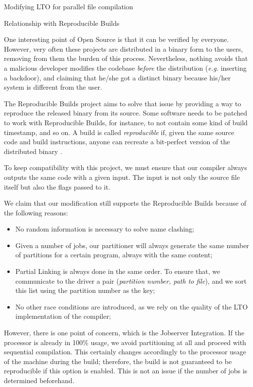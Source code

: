 \begin{section}{Modifying LTO for parallel file compilation}
\begin{subsection}{Relationship with Reproducible Builds}\label{sec:repro_builds}

One interesting point of Open Source is that it can be verified by everyone.
However, very often these projects are distributed in a binary form to the
users, removing from them the burden of this process. Nevertheless, nothing avoids that a
malicious developer modifies the codebase \textit{before} the distribution
(\textit{e.g.} inserting a backdoor), and claiming that he/she got a distinct
binary because his/her system is different from the user.

The Reproducible Builds project aims to solve that issue by providing a way to
reproduce the released binary from its source. Some software needs to
be patched to work with Reproducible Builds, for instance,
to not contain some kind of build timestamp, and so on. A build
is called \textit{reproducible} if, given the same source code and build
instructions, anyone can recreate a bit-perfect version of the distributed
binary \citep{reproducible_builds}.

To keep compatibility with this project, we must ensure that our compiler
always outputs the same code with a given input. The input is not only
the source file itself but also the flags passed to it.

We claim that our modification still supports the Reproducible Builds because
of the following reasons:

\begin{itemize}
	\item No random information is necessary to solve name clashing;
	\item Given a number of jobs, our partitioner will always generate
	the same number of partitions for a certain program, always with the same content;
	\item Partial Linking is always done in the same order. To ensure that,
	we communicate to the driver a pair (\textit{partition number, path to file}),
	and we sort this list using the partition number as the key;
	\item No other race conditions are introduced, as we rely on the quality of
	the LTO implementation of the compiler;
\end{itemize}

However, there is one point of concern, which is the Jobserver Integration.  If
the processor is already in 100\% usage, we avoid partitioning at all and
proceed with sequential compilation. This certainly changes accordingly to the
processor usage of the machine during the build; therefore, the build is not
guaranteed to be reproducible if this option is enabled. This is not an issue
if the number of jobs is determined beforehand.


\end{subsection}
\end{section}
